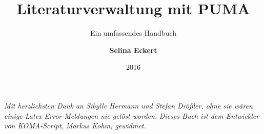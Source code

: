 \documentclass[b5paper,11pt,twoside]{scrbook} %
\begin{document}
 
    \title{\Huge Literaturverwaltung mit PUMA}
    \subtitle{\Large Ein umfassendes Handbuch}
    \author{\textbf{Selina Eckert}}
    \date{2016}

\maketitle
\newpage
\textit{Mit herzlichsten Dank an Sibylle Hermann und Stefan Drößler, ohne sie wären einige Latex-Error-Meldungen nie gelöst worden.}\newline\newline
\textit{Dieses Buch ist dem Entwickler von KOMA-Script, Markus Kohm, gewidmet.}%
\clearpage
\tableofcontents 
\setcounter{secnumdepth}{3} 
\setcounter{tocdepth}{3} 
\newpage
{}
\pagestyle{headings}








 



\renewcommand{\indexname}{Stichwortverzeichnis}
\printindex
\end{document}
